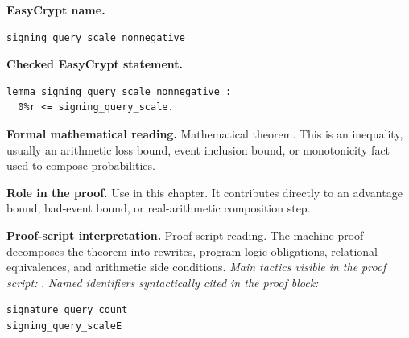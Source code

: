 \begin{formaltheorem}
\noindent\textbf{EasyCrypt name.}
\begin{lstlisting}[language=EasyCrypt,basicstyle=\ttfamily\scriptsize]
signing_query_scale_nonnegative
\end{lstlisting}
\noindent\textbf{Checked EasyCrypt statement.}
\begin{lstlisting}[language=EasyCrypt,basicstyle=\ttfamily\scriptsize]
lemma signing_query_scale_nonnegative :
  0%r <= signing_query_scale.
\end{lstlisting}
\noindent\textbf{Formal mathematical reading.}
Mathematical theorem. This is an inequality, usually an arithmetic loss bound, event inclusion bound, or monotonicity fact used to compose probabilities.

\noindent\textbf{Role in the proof.}
Use in this chapter. It contributes directly to an advantage bound, bad-event bound, or real-arithmetic composition step.

\noindent\textbf{Proof-script interpretation.}
Proof-script reading. The machine proof decomposes the theorem into rewrites, program-logic obligations, relational equivalences, and arithmetic side conditions.
\emph{Main tactics visible in the proof script:} .
\emph{Named identifiers syntactically cited in the proof block:}
\begin{lstlisting}[language=EasyCrypt,basicstyle=\ttfamily\scriptsize]
signature_query_count
signing_query_scaleE
\end{lstlisting}

\end{formaltheorem}

